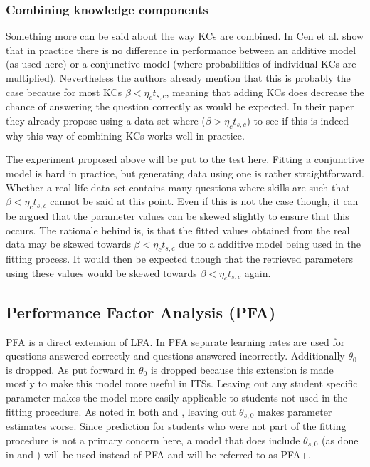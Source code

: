 \documentclass{scrartcl}
\begin{document}
\subsubsection{Combining knowledge components}
\label{sec:comb}
Something more can be said about the way KCs are combined. In \cite{skillcombi} Cen et al. show that in practice there is no difference in performance between an additive model (as used here) or a conjunctive model (where probabilities of individual KCs are multiplied). Nevertheless the authors already mention that this is probably the case because for most KCs $\beta < \eta_{c} t_{s,c}$, meaning that adding KCs does decrease the chance of answering the question correctly as would be expected. In their paper they already propose using a data set where ($\beta > \eta_{c} t_{s,c}$) to see if this is indeed why this way of combining KCs works well in practice.

The experiment proposed above will be put to the test here. Fitting a conjunctive model is hard in practice, but generating data using one is rather straightforward. Whether a real life data set contains many questions where skills are such that $\beta < \eta_{c} t_{s,c}$ cannot be said at this point. Even if this is not the case though, it can be argued that the parameter values can be skewed slightly to ensure that this occurs. The rationale behind is, is that the fitted values obtained from the real data may be skewed towards $\beta < \eta_{c} t_{s,c}$ due to a additive model being used in the fitting process. It would then be expected though that the retrieved parameters using these values would be skewed towards $\beta < \eta_{c} t_{s,c}$ again.

\subsection{Performance Factor Analysis (PFA)}
PFA is a direct extension of LFA. In PFA separate learning rates are used for questions answered correctly and questions answered incorrectly. Additionally $\theta_{0}$ is dropped. As put forward in \cite{pfa} $\theta_{0}$ is dropped because this extension is made mostly to make this model more useful in ITSs. Leaving out any student specific parameter makes the model more easily applicable to students not used in the fitting procedure. As noted in both \cite{ktpfa} and \cite{blackart}, leaving out $\theta_{s,0}$ makes parameter estimates worse. Since prediction for students who were not part of the fitting procedure is not a primary concern here, a model that does include $\theta_{s,0}$ (as done in \cite{ktpfa} and \cite{blackart}) will be used instead of PFA and will be referred to as PFA+.
\end{document}
